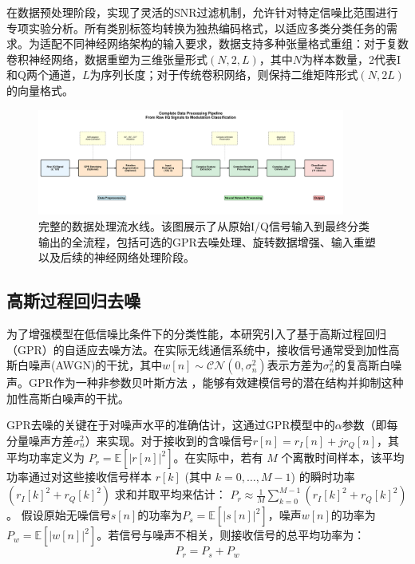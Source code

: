 \documentclass[conference]{IEEEtran}
\begin{document}
在数据预处理阶段，实现了灵活的SNR过滤机制，允许针对特定信噪比范围进行专项实验分析。所有类别标签均转换为独热编码格式，以适应多类分类任务的需求。为适配不同神经网络架构的输入要求，数据支持多种张量格式重组：对于复数卷积神经网络，数据重塑为三维张量形式$(N, 2, L)$，其中$N$为样本数量，2代表I和Q两个通道，$L$为序列长度；对于传统卷积网络，则保持二维矩阵形式$(N, 2L)$的向量格式。

\begin{figure}[htbp]
\centering
\includegraphics[width=0.9\textwidth]{figure/data_processing_pipeline.png}
\caption{完整的数据处理流水线。该图展示了从原始I/Q信号输入到最终分类输出的全流程，包括可选的GPR去噪处理、旋转数据增强、输入重塑以及后续的神经网络处理阶段。}
\label{fig:data_pipeline}
\end{figure}

\subsection{高斯过程回归去噪}

为了增强模型在低信噪比条件下的分类性能，本研究引入了基于高斯过程回归（GPR）的自适应去噪方法。在实际无线通信系统中，接收信号通常受到加性高斯白噪声(AWGN)的干扰，其中$w[n] \sim \mathcal{CN}(0, \sigma_n^2)$表示方差为$\sigma_n^2$的复高斯白噪声。GPR作为一种非参数贝叶斯方法 \cite{[17]}\cite{[18]}，能够有效建模信号的潜在结构并抑制这种加性高斯白噪声的干扰。

GPR去噪的关键在于对噪声水平的准确估计，这通过GPR模型中的$\alpha$参数（即每分量噪声方差$\sigma_n^2$）来实现。对于接收到的含噪信号$r[n]=r_I[n]+jr_Q[n]$，其平均功率定义为 $P_r = \mathbb{E}[|r[n]|^2]$。在实际中，若有 $M$ 个离散时间样本，该平均功率通过对这些接收信号样本 $r[k]$ (其中 $k=0, \ldots, M-1$) 的瞬时功率 $(r_I[k]^2 + r_Q[k]^2)$ 求和并取平均来估计：
$P_r \approx \frac{1}{M}\sum_{k=0}^{M-1}(r_I[k]^2+r_Q[k]^2)$。
假设原始无噪信号$s[n]$的功率为$P_s = \mathbb{E}[|s[n]|^2]$，噪声$w[n]$的功率为$P_w = \mathbb{E}[|w[n]|^2]$。若信号与噪声不相关，则接收信号的总平均功率为：
\begin{equation}
P_r = P_s + P_w
\end{equation}
\end{document}
